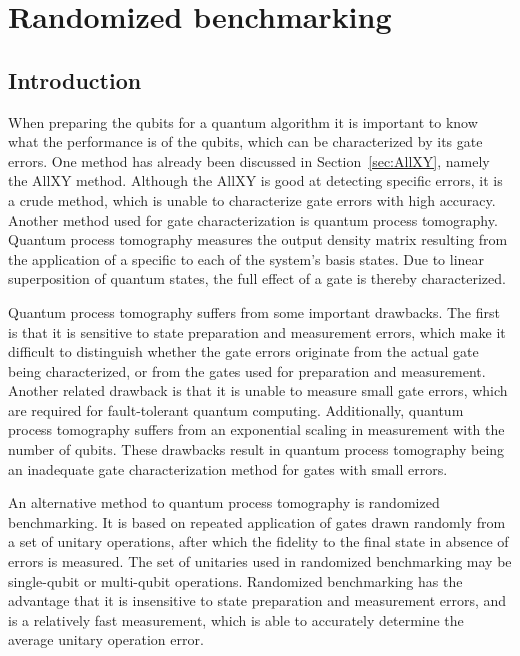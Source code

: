   \chapter{Randomized benchmarking}
    \label{ch:randomized benchmarking}

    \section{Introduction}
      \label{sec:RB introduction}
      When preparing the qubits for a quantum algorithm it is important to know what the performance is of the qubits, which can be characterized by its gate errors. One method has already been discussed in Section~\ref{sec:AllXY}, namely the AllXY method. Although the AllXY is good at detecting specific errors, it is a crude method, which is unable to characterize gate errors with high accuracy. Another method used for gate characterization is quantum process tomography. Quantum process tomography measures the output density matrix resulting from the application of a specific to each of the system's basis states. Due to linear superposition of quantum states, the full effect of a gate is thereby characterized.

      Quantum process tomography suffers from some important drawbacks. The first is that it is sensitive to state preparation and measurement errors, which make it difficult to distinguish whether the gate errors originate from the actual gate being characterized, or from the gates used for preparation and measurement. Another related drawback is that it is unable to measure small gate errors, which are required for fault-tolerant quantum computing. Additionally, quantum process tomography suffers from an exponential scaling in measurement with the number of qubits. These drawbacks result in quantum process tomography being an inadequate gate characterization method for gates with small errors.

      An alternative method to quantum process tomography is randomized benchmarking. It is based on repeated application of gates drawn randomly from a set of unitary operations, after which the fidelity to the final state in absence of errors is measured. The set of unitaries used in randomized benchmarking may be single-qubit or multi-qubit operations. Randomized benchmarking has the advantage that it is insensitive to state preparation and measurement errors, and is a relatively fast measurement, which is able to accurately determine the average unitary operation error.

